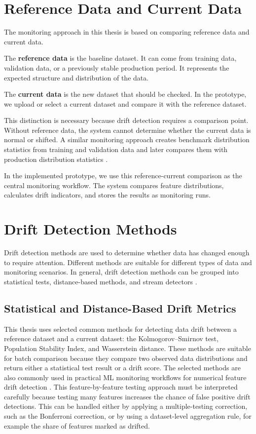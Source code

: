 \section{Reference Data and Current Data}

The monitoring approach in this thesis is based on comparing reference data and current data.

The \textbf{reference data} is the baseline dataset. It can come from training data, validation data, or a previously stable production period. It represents the expected structure and distribution of the data.

The \textbf{current data} is the new dataset that should be checked. In the prototype, we upload or select a current dataset and compare it with the reference dataset.

This distinction is necessary because drift detection requires a comparison point. Without reference data, the system cannot determine whether the current data is normal or shifted. A similar monitoring approach creates benchmark distribution statistics from training and validation data and later compares them with production distribution statistics \cite{MonitoringPerformance}.

In the implemented prototype, we use this reference-current comparison as the central monitoring workflow. The system compares feature distributions, calculates drift indicators, and stores the results as monitoring runs.

\section{Drift Detection Methods}

Drift detection methods are used to determine whether data has changed enough to require attention. Different methods are suitable for different types of data and monitoring scenarios. In general, drift detection methods can be grouped into statistical tests, distance-based methods, and stream detectors \cite{LearningUnderConceptDrift}.

\subsection{Statistical and Distance-Based Drift Metrics}

This thesis uses selected common methods for detecting data drift between a reference dataset and a current dataset: the Kolmogorov--Smirnov test, Population Stability Index, and Wasserstein distance. These methods are suitable for batch comparison because they compare two observed data distributions and return either a statistical test result or a drift score. The selected methods are also commonly used in practical ML monitoring workflows for numerical feature drift detection \cite{EvidentlyDataDriftLargeDatasets,SciPyDocumentation}. This feature-by-feature testing approach must be interpreted carefully because testing many features increases the chance of false positive drift detections. This can be handled either by applying a multiple-testing correction, such as the Bonferroni correction, or by using a dataset-level aggregation rule, for example the share of features marked as drifted.

